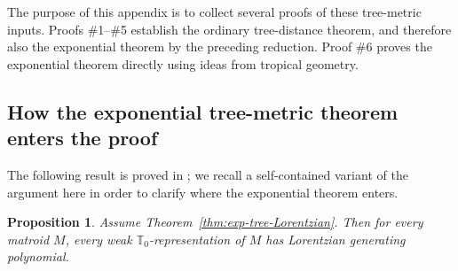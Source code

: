 \documentclass[12pt]{amsart}
\newtheorem{proposition}[theorem]{Proposition}
\theoremstyle{definition}
\newcommand{\1}{\mathbf{1}}
\newcommand\T{{\mathbb T}}
\begin{document}
The purpose of this appendix is to collect several proofs of these tree-metric inputs.
Proofs \#1--\#5 establish the ordinary tree-distance theorem, and therefore also the
exponential theorem by the preceding reduction.  Proof \#6 proves the exponential
theorem directly using ideas from tropical geometry.

\subsection{How the exponential tree-metric theorem enters the proof}
\label{app:reductions}

The following result is proved in \cite{Branden-Huh20}; we recall a self-contained
variant of the argument here in order to clarify where the exponential theorem enters.

\begin{proposition}
\label{prop:appendix-matroid-reduction}
Assume Theorem~\ref{thm:exp-tree-Lorentzian}.  Then for every matroid $M$, every
weak $\T_0$-representation of $M$ has Lorentzian generating polynomial.
\end{proposition}
\end{document}

